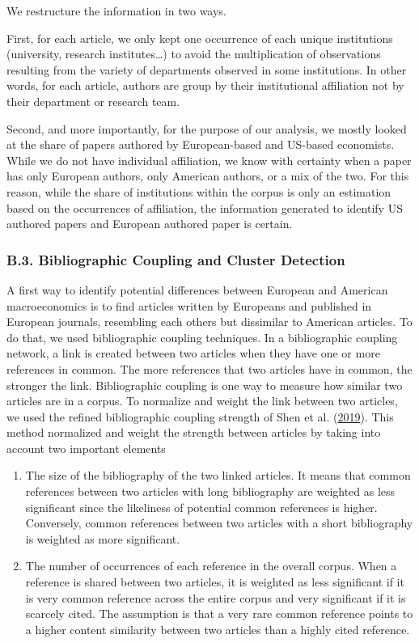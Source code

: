 \documentclass[]{elsarticle} %
\providecommand{\tightlist}{%
  \setlength{\itemsep}{0pt}\setlength{\parskip}{0pt}}
\begin{document}
We restructure the information in two ways.

First, for each article, we only kept one occurrence of each unique
institutions (university, research institutes\ldots) to avoid the
multiplication of observations resulting from the variety of departments
observed in some institutions. In other words, for each article, authors
are group by their institutional affiliation not by their department or
research team.

Second, and more importantly, for the purpose of our analysis, we mostly
looked at the share of papers authored by European-based and US-based
economists. While we do not have individual affiliation, we know with
certainty when a paper has only European authors, only American authors,
or a mix of the two. For this reason, while the share of institutions
within the corpus is only an estimation based on the occurrences of
affiliation, the information generated to identify US authored papers
and European authored paper is certain.

\hypertarget{network}{%
\subsubsection*{B.3. Bibliographic Coupling and Cluster
Detection}\label{network}}

A first way to identify potential differences between European and
American macroeconomics is to find articles written by Europeans and
published in European journals, resembling each others but dissimilar to
American articles. To do that, we used bibliographic coupling
techniques. In a bibliographic coupling network, a link is created
between two articles when they have one or more references in common.
The more references that two articles have in common, the stronger the
link. Bibliographic coupling is one way to measure how similar two
articles are in a corpus. To normalize and weight the link between two
articles, we used the refined bibliographic coupling strength of Shen et
al. (\protect\hyperlink{ref-shen2019}{2019}). This method normalized and
weight the strength between articles by taking into account two
important elements

\begin{enumerate}
\def\labelenumi{\arabic{enumi}.}
\tightlist
\item
  The size of the bibliography of the two linked articles. It means that
  common references between two articles with long bibliography are
  weighted as less significant since the likeliness of potential common
  references is higher. Conversely, common references between two
  articles with a short bibliography is weighted as more significant.
\item
  The number of occurrences of each reference in the overall corpus.
  When a reference is shared between two articles, it is weighted as
  less significant if it is very common reference across the entire
  corpus and very significant if it is scarcely cited. The assumption is
  that a very rare common reference points to a higher content
  similarity between two articles than a highly cited reference.
\end{enumerate}
\end{document}
